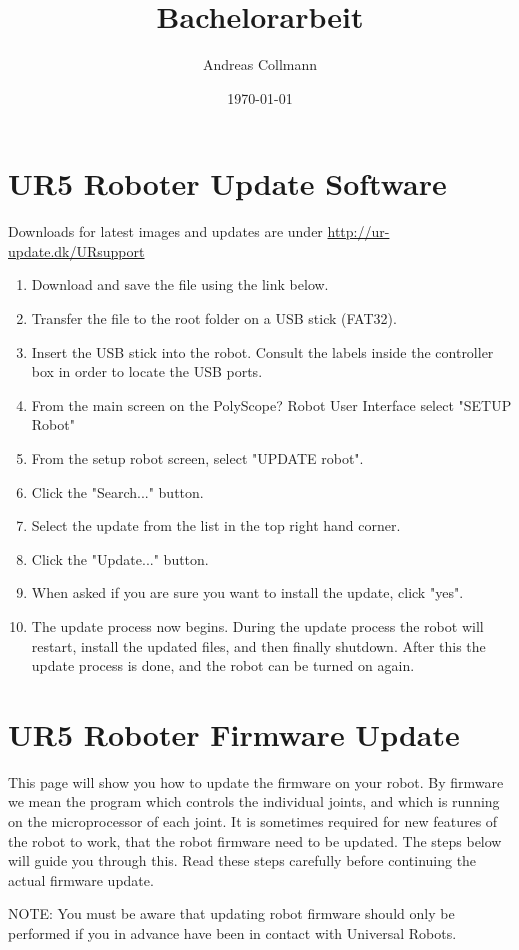 \documentclass[
a4paper,
12pt,
oneside,
headsepline,		%
footsepline,		%
]{scrbook}
\title{Bachelorarbeit}
\author{Andreas Collmann}
\date{\today}
\begin{document}
\tableofcontents

\chapter{UR5 Roboter Update Software}

Downloads for latest images and updates are under \url{http://ur-update.dk/URsupport}

\begin{enumerate}
	\item Download and save the file using the link below.
    \item Transfer the file to the root folder on a USB stick (FAT32).
    \item Insert the USB stick into the robot. Consult the labels inside the controller box in order to locate the USB ports.
    \item From the main screen on the PolyScope? Robot User Interface select "SETUP Robot"
    \item From the setup robot screen, select "UPDATE robot".
    \item Click the "Search..." button.
    \item Select the update from the list in the top right hand corner.
    \item Click the "Update..." button.
    \item When asked if you are sure you want to install the update, click "yes".
    \item The update process now begins. During the update process the robot will restart, install the updated files, and then finally shutdown. After this the update process is done, and the robot can be turned on again. 
\end{enumerate}


\chapter{UR5 Roboter Firmware Update}

This page will show you how to update the firmware on your robot. By firmware we mean the program which controls the individual joints, and which is running on the microprocessor of each joint. It is sometimes required for new features of the robot to work, that the robot firmware need to be updated. The steps below will guide you through this. Read these steps carefully before continuing the actual firmware update.

NOTE: You must be aware that updating robot firmware should only be performed if you in advance have been in contact with Universal Robots. 
\end{document}

